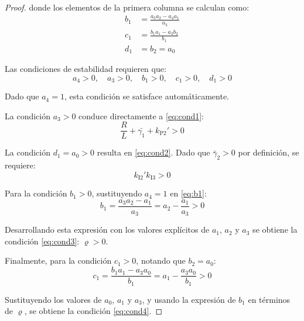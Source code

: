 \begin{lemma}
\begin{proof}
        donde los elementos de la primera columna se calculan como:
        \begin{align}
        b_1 &= \frac{a_3a_2 - a_4a_1}{a_3} \label{eq:b1} \\
        c_1 &= \frac{b_1a_1 - a_3b_2}{b_1} \label{eq:c1} \\
        d_1 &= b_2 = a_0 \label{eq:d1}
        \end{align}

        Las condiciones de estabilidad requieren que:
        \begin{equation}\label{eq:routh_conditions}
            a_4 > 0, \quad a_3 > 0, \quad b_1 > 0, \quad c_1 > 0, \quad d_1 > 0
        \end{equation}

        Dado que $a_4 = 1$, esta condición se satisface automáticamente.

        La condición $a_3 > 0$ conduce directamente a \eqref{eq:cond1}:
        \begin{equation*}
            \frac{R}{L} + \bar{\gamma_1} + k_{\textrm{P2}}' > 0
        \end{equation*}

        La condición $d_1 = a_0 > 0$ resulta en \eqref{eq:cond2}. Dado que $\bar{\gamma}_2 > 0$ por definición, se requiere:
        \begin{equation*}
            k_{\textrm{I2}}'k_{\textrm{I3}} > 0
        \end{equation*}

        Para la condición $b_1 > 0$, sustituyendo $a_4 = 1$ en \eqref{eq:b1}:
        \begin{equation*}
            b_1 = \frac{a_3a_2 - a_1}{a_3} = a_2 - \frac{a_1}{a_3} > 0
        \end{equation*}

        Desarrollando esta expresión con los valores explícitos de $a_1$, $a_2$ y $a_3$ se obtiene la condición \eqref{eq:cond3}: $\varrho > 0$.

        Finalmente, para la condición $c_1 > 0$, notando que $b_2 = a_0$:
        \begin{equation*}
            c_1 = \frac{b_1a_1 - a_3a_0}{b_1} = a_1 - \frac{a_3a_0}{b_1} > 0
        \end{equation*}

        Sustituyendo los valores de $a_0$, $a_1$ y $a_3$, y usando la expresión de $b_1$ en términos de $\varrho$, se obtiene la condición \eqref{eq:cond4}.
    \end{proof}
\end{lemma}

